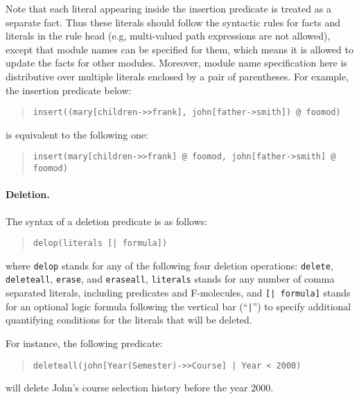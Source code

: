 \documentclass[11pt]{article}
\begin{document}
Note that each literal appearing inside the insertion predicate is
treated as a separate fact. Thus these literals should follow the
syntactic rules for facts and literals in the rule head (e.g,
multi-valued path expressions are not allowed), except that module
names can be specified for them, which means it is allowed to update
the facts for other modules. Moreover, module name specification here
is distributive over multiple literals enclosed by a pair of
parentheses. For example, the insertion predicate below:
\begin{quote}
\verb|insert((mary[children->>frank], john[father->smith]) @ foomod)|
\end{quote}
is equivalent to the following one:
\begin{quote}
\verb|insert(mary[children->>frank] @ foomod, john[father->smith] @ foomod)|
\end{quote}


%
\paragraph{Deletion.} The syntax of a deletion predicate is as follows:
\begin{quote}
\begin{verbatim}
delop(literals [| formula])
\end{verbatim}
\end{quote}
where {\tt delop} stands for any of the following four deletion
operations: {\tt delete}, {\tt deleteall}, {\tt erase}, and
{\tt eraseall}, {\tt literals} stands for any number of comma
separated literals, including predicates and \mbox{F-molecules},
and {\tt [| formula]} stands for an optional logic formula following
the vertical bar (``{\tt |}'') to specify additional quantifying
conditions for the literals that will be deleted.

For instance, the following predicate:
\begin{quote}
\begin{verbatim}
deleteall(john[Year(Semester)->>Course] | Year < 2000)
\end{verbatim}
\end{quote}
will delete {\sf John}'s course selection history before the year
2000.
\end{document}

